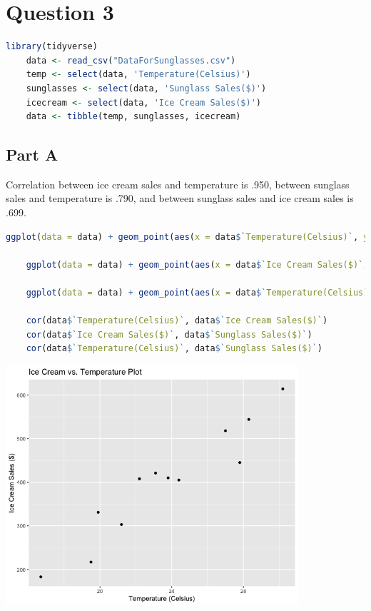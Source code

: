 \documentclass[letterpaper]{article}
\begin{document}
\newpage

\section*{Question 3}

\begin{lstlisting}[language=R]
    library(tidyverse)
    data <- read_csv("DataForSunglasses.csv")
    temp <- select(data, 'Temperature(Celsius)')
    sunglasses <- select(data, 'Sunglass Sales($)')
    icecream <- select(data, 'Ice Cream Sales($)')
    data <- tibble(temp, sunglasses, icecream)
\end{lstlisting}

\subsection*{Part A}

Correlation between ice cream sales and temperature is .950, between sunglass sales and temperature is .790, and between sunglass sales and ice cream sales is .699.

\begin{lstlisting}[language=R]
    ggplot(data = data) + geom_point(aes(x = data$`Temperature(Celsius)`, y = data$`Ice Cream Sales($)`)) + xlab("Temperature (Celsius)") + ylab("Ice Cream Sales ($)") + ggtitle("Ice Cream vs. Temperature Plot")

    ggplot(data = data) + geom_point(aes(x = data$`Ice Cream Sales($)`, y = data$`Sunglass Sales($)`)) + xlab("Ice Cream Sales ($)") + ylab("Sunglasses Sales ($)") + ggtitle("Sunglasses vs. Ice Cream Plot")

    ggplot(data = data) + geom_point(aes(x = data$`Temperature(Celsius)`, y = data$`Sunglass Sales($)`)) + xlab("Temperature (Celsius") + ylab("Sunglasses Sales ($)") + ggtitle("Sunglasses vs. Temperature Plot")

    cor(data$`Temperature(Celsius)`, data$`Ice Cream Sales($)`)
    cor(data$`Ice Cream Sales($)`, data$`Sunglass Sales($)`)
    cor(data$`Temperature(Celsius)`, data$`Sunglass Sales($)`)
\end{lstlisting}

\begin{center}
    \includegraphics[height=3.5in]{icecream_temp.png}
\end{center}
\end{document}
